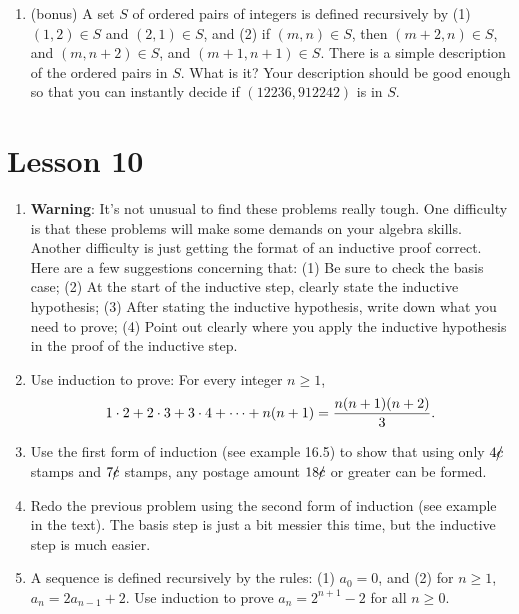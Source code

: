 \documentclass[11pt]{amsart}
\begin{document}
\begin{enumerate}
\item (bonus)  A set $S$ of ordered pairs of integers is defined recursively
by (1) $(1,2)\in S$  and $(2,1)\in S$,  and (2) if $(m,n)\in S$, then $(m+2,n)\in S$, and
$(m,n+2)\in S$, and $(m+1,n+1)\in S$. There is a simple description
of the ordered pairs in $S$. What is it?  Your description should be good enough so that 
you can instantly decide if $(12236, 912242)$ is in $S$. \\[5pt]


\end{enumerate}

\section{Lesson 10}

\begin{enumerate}

\item[]
{\small {\bf Warning}: It's not unusual to find these problems really tough. One difficulty is that these problems will make some demands on your algebra skills. Another difficulty is just getting the format of an inductive proof correct.  Here are a few suggestions concerning that: (1)
Be sure to check the basis case; (2) At the start of the inductive step, clearly state the inductive hypothesis;
(3) After stating the inductive hypothesis, write down what you need to prove; (4) Point out clearly where you
apply the inductive hypothesis in the proof of the inductive step.}\\[3pt] 


\item Use induction to prove: For every integer $n\geq 1$,
\[
1\cdot 2+ 2\cdot 3+3\cdot4+\cdots+n(n+1) = \frac{n(n+1)(n+2)}{3}.\\[5pt]
\]

\item  Use the first form of induction (see example 16.5) to show that using only $4 c\kern -5pt/$ stamps and  $7c\kern -5pt/$ stamps,
any postage amount $18c\kern -5pt/$ or greater can be formed.\\[5pt]

\item  Redo the previous problem using the second form of induction (see example in the text). The basis step is just a bit messier this time, but the inductive step is much easier.\\[5pt]

\item A sequence is defined recursively by the rules: (1) $a_{0} = 0$, and (2) for $n\geq 1$, $a_{n}= 2a_{n-1}+ 2$. Use induction to prove $a_{n}= 2^{n+1}-2$ for all $n\geq 0$.\\[5pt]


\end{enumerate}
\end{document}
